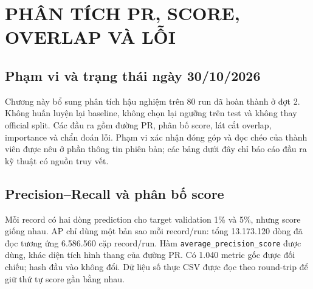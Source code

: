 
\chapter{PHÂN TÍCH PR, SCORE, OVERLAP VÀ LỖI}
\label{chap:dot3}
\section{Phạm vi và trạng thái ngày 30/10/2026}
Chương này bổ sung phân tích hậu nghiệm trên 80 run đã hoàn thành ở đợt 2. Không huấn luyện lại baseline, không chọn lại ngưỡng trên test và không thay official split. Các đầu ra gồm đường PR, phân bố score, lát cắt overlap, importance và chẩn đoán lỗi. Phạm vi xác nhận đóng góp và đọc chéo của thành viên được nêu ở phần thông tin phiên bản; các bảng dưới đây chỉ báo cáo đầu ra kỹ thuật có nguồn truy vết.



\section{Precision--Recall và phân bố score}
Mỗi record có hai dòng prediction cho target validation 1\% và 5\%, nhưng score giống nhau. AP chỉ dùng một bản sao mỗi record/run: tổng 13.173.120 dòng đã đọc tương ứng 6.586.560 cặp record/run. Hàm \texttt{average\_precision\_score} được dùng, khác diện tích hình thang của đường PR. Có 1.040 metric gốc được đối chiếu; hash đầu vào không đổi. Dữ liệu số thực CSV được đọc theo round-trip để giữ thứ tự score gần bằng nhau.

